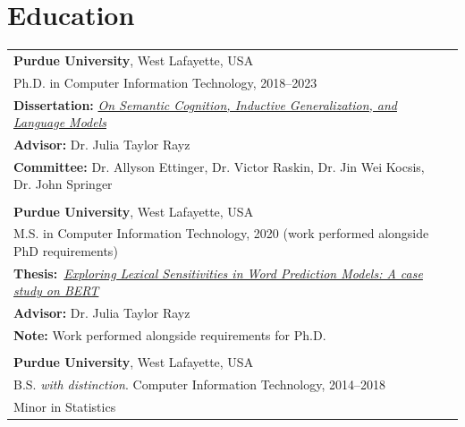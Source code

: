 \documentclass[11pt]{article}
\begin{document}
\section*{Education}
\begin{tabularx}{\textwidth}{@{}p{\textwidth}l}
\textbf{Purdue University}, West Lafayette, USA\\
Ph.D. in Computer Information Technology, 2018--2023\\
\textbf{Dissertation:} \href{https://hammer.purdue.edu/articles/thesis/On_Semantic_Cognition_Inductive_Generalization_and_Language_Models/24084816}{\textit{On Semantic Cognition, Inductive Generalization, and Language Models}}\\
\textbf{Advisor:} Dr. Julia Taylor Rayz\\
\textbf{Committee:} Dr. Allyson Ettinger, Dr. Victor Raskin, Dr. Jin Wei Kocsis, Dr. John Springer\\\\
\textbf{Purdue University}, West Lafayette, USA\\
M.S. in Computer Information Technology, 2020 (work performed alongside PhD requirements)\\
\textbf{Thesis:}~\href{https://hammer.figshare.com/articles/thesis/Exploring_Lexical_Sensitivities_in_Word_Prediction_Models_A_case_study_on_BERT/13308830}{\textit{Exploring Lexical Sensitivities in Word Prediction Models: A case study on BERT}}\\
\textbf{Advisor:} Dr. Julia Taylor Rayz\\
\textbf{Note:} Work performed alongside requirements for Ph.D.\\\\

\textbf{Purdue University}, West Lafayette, USA\\
B.S. \textit{with distinction}. Computer Information Technology, 2014--2018\\
Minor in Statistics
\end{tabularx}
\end{document}
